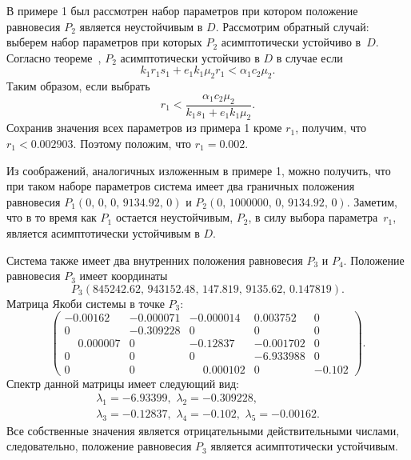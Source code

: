 \documentclass[14pt,a4paper]{extarticle}
\begin{document}
	\begin{example}
		В примере 1 был рассмотрен набор параметров при котором положение равновесия $P_2$ является неустойчивым в $D$. Рассмотрим обратный случай: выберем набор параметров при которых $P_2$ асимптотически устойчиво в~$D$. Согласно теореме~, $P_2$ асимптотически устойчиво в $D$ в случае если
		\[k_1r_1s_1 + e_1k_1\mu_2r_1 < \alpha_1c_2\mu_2.\]
		Таким образом, если выбрать 
		\[r_1 < \dfrac{\alpha_1c_2\mu_2}{k_1s_1 + e_1k_1\mu_2}.\]
		Сохранив значения всех параметров из примера 1 кроме $r_1$, получим, что $r_1 < 0.002903$. Поэтому положим, что $r_1=0.002$.
		
		Из соображений, аналогичных изложенным в примере 1, можно получить, что при таком наборе параметров система имеет два граничных положения равновесия $P_1\left(0,\,0,\,0,\,9134.92,\,0\right)$ и $P_2\left(0,\,1000000,\,0,\,9134.92,\,0\right)$. Заметим, что в то время как $P_1$ остается неустойчивым, $P_2$, в силу выбора параметра~$r_1$, является асимптотически устойчивым в $D$.
		
		Система также имеет два внутренних положения равновесия $P_3$ и $P_4$. Положение равновесия $P_3$ имеет координаты
		\[P_3\left(845242.62,\, 943152.48,\, 147.819,\, 9135.62,\, 0.147819\right).\]
		Матрица Якоби системы в точке $P_3$: 
		\[\begin{pmatrix}
			-0.00162 & -0.000071& -0.000014&  0.003752&  0\\
			 0  &     -0.309228  & 0     &   0     &   0\\
			 \phantom{-}0.000007 & 0    &   -0.12837&  -0.001702 & 0\\
			 0&        0&        0     &  -6.933988&  0\\
			 0 &       0&        \phantom{-}0.000102 & 0 &       -0.102
		\end{pmatrix}.\]
		Спектр данной матрицы имеет следующий вид:
		\begin{multline*}
			\lambda_1=-6.93399,\,\, \lambda_2=-0.309228,\\
			\lambda_3=-0.12837,\,\, \lambda_4=-0.102,\,\, \lambda_5=-0.00162.
		\end{multline*}
		Все собственные значения является отрицательными действительными числами, следовательно, положение равновесия $P_3$ является асимптотически устойчивым.
		

\end{example}
\end{document}
